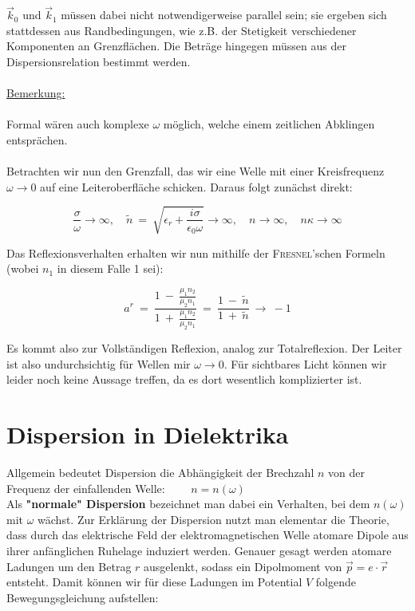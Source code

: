 $\vec{k}_0$ und $\vec{k}_1$ müssen dabei nicht notwendigerweise parallel sein; sie ergeben sich stattdessen aus Randbedingungen, wie z.B. der Stetigkeit verschiedener Komponenten an Grenzflächen. Die Beträge hingegen müssen aus der Dispersionsrelation bestimmt werden.
\ \\
\ \\
\underline{Bemerkung:}\\
\ \\
Formal wären auch komplexe $\omega$ möglich, welche einem zeitlichen Abklingen entsprächen.
\ \\
\ \\
Betrachten wir nun den Grenzfall, das wir eine Welle mit einer Kreisfrequenz $\omega \rightarrow 0$ auf eine Leiteroberfläche schicken. Daraus folgt zunächst direkt:

\begin{equation*}
\frac{\sigma}{\omega} \rightarrow \infty, \quad \tilde{n} \ = \ \sqrt{\epsilon_r + \frac{i\sigma}{\epsilon_0 \omega}}\rightarrow\infty, \quad n\rightarrow\infty,\quad n\kappa\rightarrow\infty
\end{equation*}

Das Reflexionsverhalten erhalten wir nun mithilfe der \textsc{Fresnel}'schen Formeln (wobei $n_1$ in diesem Falle 1 sei):

\begin{equation*}
a^r  \ = \  \frac{1 \ - \ \frac{\mu_1 n_2}{\mu_2 n_1}}{1 \ + \ \frac{\mu_1 n_2}{\mu_2 n_1}} \ = \ \frac{1 \ - \ \tilde{n}}{1\ + \ \tilde{n}} \ \rightarrow\  -1
\end{equation*}

Es kommt also zur Vollständigen Reflexion, analog zur Totalreflexion. Der Leiter ist also undurchsichtig für Wellen mir $\omega \rightarrow 0$. Für sichtbares Licht können wir leider noch keine Aussage treffen, da es dort wesentlich komplizierter ist.

\section{Dispersion in Dielektrika}

Allgemein bedeutet Dispersion die Abhängigkeit der Brechzahl $n$ von der Frequenz der einfallenden Welle: $\qquad n = n (\omega)$\\
Als \textbf{"normale" Dispersion} bezeichnet man dabei ein Verhalten, bei dem $n(\omega)$ mit $\omega$ wächst.
Zur Erklärung der Dispersion nutzt man elementar die Theorie, dass  durch das elektrische Feld der elektromagnetischen Welle atomare Dipole aus ihrer anfänglichen Ruhelage induziert werden. Genauer gesagt werden atomare Ladungen um den Betrag $r$ ausgelenkt, sodass ein Dipolmoment von $\vec{p}=e\cdot\vec{r}$ entsteht. Damit können  wir für diese Ladungen im Potential $V$ folgende Bewegungsgleichung aufstellen:


